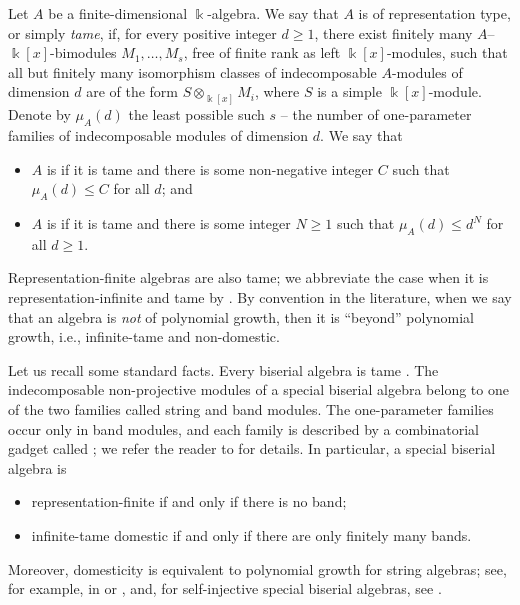 \documentclass[a4paper,leqno]{amsart}
\begin{document}
\begin{dfn}
Let $A$ be a finite-dimensional $\Bbbk$-algebra.
We say that $A$ is of  representation type, or simply \emph{tame}, if, for every positive integer $d\geq 1$, there exist finitely many $A$--$\Bbbk[x]$-bimodules $M_1,\ldots,M_s$, free of finite rank as left $\Bbbk[x]$-modules, such that all but finitely many isomorphism classes of indecomposable $A$-modules of dimension $d$ are of the form $S\otimes_{\Bbbk[x]}M_i$, where $S$ is a simple $\Bbbk[x]$-module. Denote by $\mu_A(d)$ the least possible such $s$ -- the number of one-parameter families of indecomposable modules of dimension $d$.
We say that
\begin{itemize}
\item $A$ is  if it is tame and there is some non-negative integer $C$ such that $\mu_A(d)\le C$ for all $d$; and

\item $A$ is  if it is tame and there is some integer $N\ge 1$ such that $\mu_A(d)\leq d^N$ for all $d\geq 1$.
\end{itemize}
\end{dfn}

\begin{rmk}
Representation-finite algebras are also tame; we abbreviate the case when it is representation-infinite and tame by .
By convention in the literature, when we say that an algebra is \emph{not} of polynomial growth, then it is ``beyond'' polynomial growth, i.e., infinite-tame and non-domestic.  
\end{rmk} 

Let us recall some standard facts. 
Every biserial algebra is tame \cite{CB95}. 
The indecomposable non-projective modules of a special biserial algebra belong to one of the two families called string and band modules.
The one-parameter families occur only in band modules, and each family is described by a combinatorial gadget called ; we refer the reader to \cite{BR87} for details.
In particular, a special biserial algebra is 
\begin{itemize}
    \item representation-finite if and only if  there is no band;
    \item infinite-tame domestic if and only if there are only finitely many bands.
\end{itemize}
Moreover, domesticity is equivalent to polynomial growth for string algebras; see, for example, in \cite{BR87} or \cite[Corollary~B]{EKM26}, and, for self-injective special biserial algebras, see \cite[Theorems~2.1 and~2.2]{ES92}.
\end{document}
